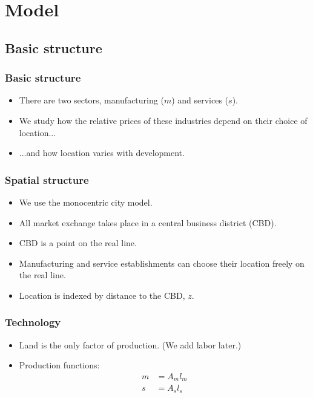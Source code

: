 \documentclass[compress,mathserif]{beamer}
\newcounter{perc}
\newcounter{percek}
\renewcommand{\time}[1]{\addtocounter{percek}{#1}}
\begin{document}


\section{Model}
\subsection{Basic structure}
\begin{frame}\frametitle{Basic structure}
\begin{itemize}
    \item There are two sectors, manufacturing ($m$) and services ($s$).
    \item We study how the relative prices of these industries depend on their choice of location...
    \item ...and how location varies with development.
\end{itemize}
\end{frame}

\begin{frame}\frametitle{Spatial structure}
\begin{itemize}
    \item We use the monocentric city model.
    \item All market exchange takes place in a central business district (CBD).
    \item CBD is a point on the real line.
    \item Manufacturing and service establishments can choose their location freely on the real line.
    \item Location is indexed by distance to the CBD, $z$.
\end{itemize}
\end{frame}

\time{2}

\begin{frame}\frametitle{Technology}
\begin{itemize}
    \item Land is the only factor of production. (We add labor later.)
    \item Production functions:
\begin{align*}
m&=A_ml_m\\
s&=A_sl_s
\end{align*}
\end{itemize}
\end{frame}

\time{1}
\end{document}
